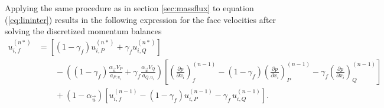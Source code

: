   Applying the same procedure as in section \ref{sec:massflux} to equation (\ref{eq:lininter}) results in the following expression for the face velocities after solving the discretized momentum balances
  \begin{align}
    \label{eq:faceinter}
    u_{i,f}^{(n*)} 
    &=
    \left[\left(1 - \gamma_f\right) u_{i,P}^{(n*)} + \gamma_f u_{i,Q}^{(n*)} \right] \nonumber \\[1em]
    &\quad\quad - 
    \left(\left(1 - \gamma_f\right) \frac{\alpha_\vec{u} V_P}{a_{P,u_i}} + \gamma_f \frac{\alpha_\vec{u} V_Q}{a_{Q,u_i}}\right)
    \left[ 
    \left(\frac{\partial p}{\partial x_i}\right)_f^{(n-1)} 
    - \left( 1 - \gamma_f \right) \left( \frac{\partial p}{\partial x_i} \right)_P^{(n-1)} 
    - \gamma_f \left(\frac{\partial p}{\partial x_i}\right)_Q^{(n-1)}
    \right] \nonumber \\[1em]
    &\quad\quad + \left(1 - \alpha_\vec{u}\right) \left[ u_{i,f}^{(n-1)} - \left(1 - \gamma_f\right) u_{i,P}^{(n-1)} - \gamma_f \, u_{i,Q}^{(n-1)} \right].
  \end{align}

